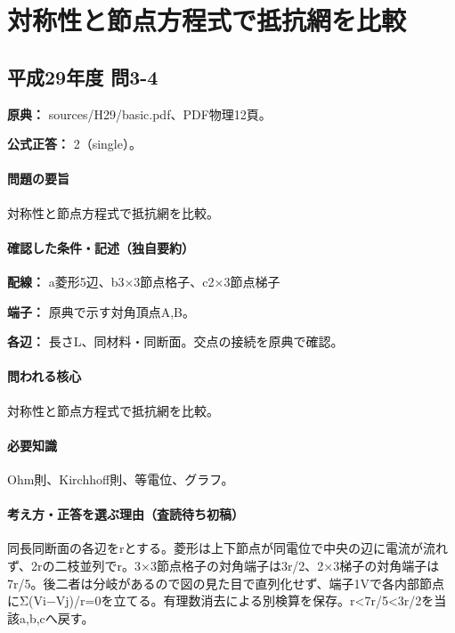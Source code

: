 \section{対称性と節点方程式で抵抗網を比較}

\subsection{平成29年度 問3-4}
\label{q:h29-reg-basic-3-4}

\noindent\textbf{原典：} sources/H29/basic.pdf、PDF物理12頁。

\textbf{公式正答：} 2（single）。

\paragraph{問題の要旨} 対称性と節点方程式で抵抗網を比較。

\paragraph{確認した条件・記述（独自要約）}\mbox{}\par

\noindent\textbf{配線：} a菱形5辺、b3×3節点格子、c2×3節点梯子\par

\noindent\textbf{端子：} 原典で示す対角頂点A,B。\par

\noindent\textbf{各辺：} 長さL、同材料・同断面。交点の接続を原典で確認。\par

\paragraph{問われる核心} 対称性と節点方程式で抵抗網を比較。

\paragraph{必要知識} Ohm則、Kirchhoff則、等電位、グラフ。

\paragraph{考え方・正答を選ぶ理由（査読待ち初稿）} 同長同断面の各辺をrとする。菱形は上下節点が同電位で中央の辺に電流が流れず、2rの二枝並列でr。3×3節点格子の対角端子は3r/2、2×3梯子の対角端子は7r/5。後二者は分岐があるので図の見た目で直列化せず、端子1Vで各内部節点にΣ(Vi−Vj)/r=\allowbreak{}0を立てる。有理数消去による別検算を保存。r<7r/5<3r/2を当該a,b,cへ戻す。

